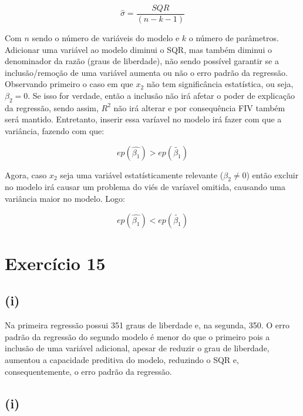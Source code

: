 \documentclass[hidelinks,11pt]{book}
\theoremstyle{definition}
\begin{document}
\begin{displaymath}
	\hat{\sigma} = \frac{SQR}{(n - k - 1)}
\end{displaymath}

Com $n$ sendo o número de variáveis do modelo e $k$ o número de parâmetros. Adicionar uma variável ao modelo diminui o SQR, mas também diminui o denominador da razão (graus de liberdade), não sendo possível garantir se a inclusão/remoção de uma variável aumenta ou não o erro padrão da regressão.\\

Observando primeiro o caso em que $x_2$ não tem significância estatística, ou seja, $\beta_2 = 0$. Se isso for verdade, então a inclusão não irá afetar o poder de explicação da regressão, sendo assim, $R^2$ não irá alterar e por consequência FIV também será mantido. Entretanto, inserir essa varíavel no modelo irá fazer com que a variância, fazendo com que:

\begin{displaymath}
	ep(\hat{\beta_1}) > ep(\tilde{\beta_1})
\end{displaymath}


Agora, caso $x_2$ seja uma variável estatísticamente relevante ($\beta_2 \not= 0$) então excluir no modelo irá causar um problema do viés de varíavel omitida, causando uma variância maior no modelo. Logo:

\begin{displaymath}
	ep(\hat{\beta_1}) < ep(\tilde{\beta_1})
\end{displaymath}

\section*{Exercício 15}

\subsection*{(i)}

Na primeira regressão possui 351 graus de liberdade e, na segunda, 350. O erro padrão da regressão do segundo modelo é menor do que o primeiro pois a inclusão de uma variável adicional, apesar de reduzir o grau de liberdade, aumentou a capacidade preditiva do modelo, reduzindo o SQR e, consequentemente, o erro padrão da regressão.

\subsection*{(i)}
\end{document}
